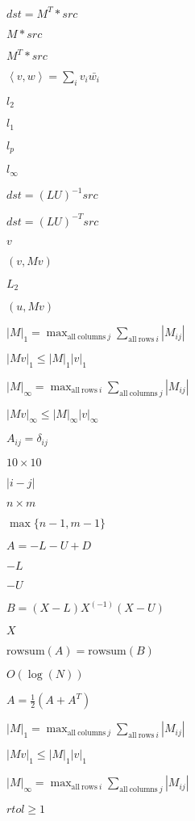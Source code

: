 \documentclass{article}
\begin{document}
$dst = M^T*src$
\pagebreak

$M*src$
\pagebreak

$M^T*src$
\pagebreak

$\left<v,w\right>=\sum_i v_i \bar{w_i}$
\pagebreak

$l_2$
\pagebreak

$l_1$
\pagebreak

$l_p$
\pagebreak

$l_\infty$
\pagebreak

$dst=(LU)^{-1}src$
\pagebreak

$dst=(LU)^{-T}src$
\pagebreak

$v$
\pagebreak

$\left(v,Mv\right)$
\pagebreak

$L_2$
\pagebreak

$\left(u,Mv\right)$
\pagebreak

$|M|_1= \max_{\mathrm{all\ columns\ } j} \sum_{\mathrm{all\ rows\ } i} |M_{ij}|$
\pagebreak

$|Mv|_1 \leq |M|_1 |v|_1$
\pagebreak

$|M|_\infty=\max_{\mathrm{all\ rows\ } i}\sum_{\mathrm{all\ columns\ } j} |M_{ij}|$
\pagebreak

$|Mv|_\infty \leq |M|_\infty |v|_\infty$
\pagebreak

$A_{ij}=\delta_{ij}$
\pagebreak

$10\times 10$
\pagebreak

$|i-j|$
\pagebreak

$n\times m$
\pagebreak

$\max\{n-1,m-1\}$
\pagebreak

$A = - L - U + D$
\pagebreak

$-L$
\pagebreak

$-U$
\pagebreak

$B = (X-L)X^(-1)(X-U)$
\pagebreak

$X$
\pagebreak

$\text{rowsum}(A) = \text{rowsum}(B)$
\pagebreak

$O(\log(N))$
\pagebreak

$A = \frac 12(A+A^T)$
\pagebreak

$|M|_1=\max_{\mathrm{all\ columns\ }j}\sum_{\mathrm{all\ rows\ } i} |M_{ij}|$
\pagebreak

$|Mv|_1\leq |M|_1 |v|_1$
\pagebreak

$|M|_\infty=\max_{\mathrm{all\ rows\ }i}\sum_{\mathrm{all\ columns\ }j} |M_{ij}|$
\pagebreak

$rtol \geq 1$
\pagebreak
\end{document}
